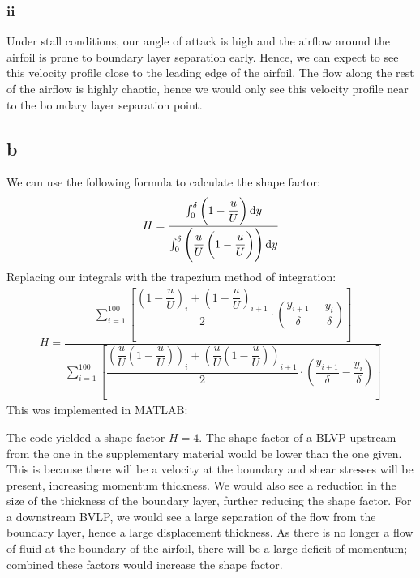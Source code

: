 \documentclass[11pt]{article}
\numberwithin{equation}{section}
\begin{document}
\subsubsection{ii}
Under stall conditions, our angle of attack is high and the airflow around the airfoil is prone to boundary layer separation early. Hence, we can expect to see this velocity profile close to the leading edge of the airfoil. The flow along the rest of the airflow is highly chaotic, hence we would only see this velocity profile near to the boundary layer separation point.
\subsection{b}
We can use the following formula to calculate the shape factor:
\begin{align}
    H = \dfrac{\int_0^{\delta}\left(1 - \dfrac{u}{U}\right)\dif y}{\int_0^{\delta}\left(\dfrac{u}{U}\left(1 - \dfrac{u}{U}\right)\right)\dif y}
\end{align}
Replacing our integrals with the trapezium method of integration:
\begin{align}
    H = \dfrac{\sum_{i=1}^{100}\left[\dfrac{\left(1-\dfrac{u}{U}\right)_i + \left(1-\dfrac{u}{U}\right)_{i+1}}{2}\cdot \left(\dfrac{y_{i+1}}{\delta} - \dfrac{y_i}{\delta}\right)\right]}{\sum_{i=1}^{100}\left[\dfrac{\left(\dfrac{u}{U}\left(1-\dfrac{u}{U}\right)\right)_i + \left(\dfrac{u}{U}\left(1-\dfrac{u}{U}\right)\right)_{i+1}}{2}\cdot \left(\dfrac{y_{i+1}}{\delta} - \dfrac{y_i}{\delta}\right)\right]}
\end{align}
This was implemented in MATLAB:

The code yielded a shape factor $H = 4$. The shape factor of a BLVP upstream from the one in the supplementary material would be lower than the one given. This is because there will be a velocity at the boundary and shear stresses will be present, increasing momentum thickness. We would also see a reduction in the size of the thickness of the boundary layer, further reducing the shape factor. For a downstream BVLP, we would see a large separation of the flow from the boundary layer, hence a large displacement thickness. As there is no longer a flow of fluid at the boundary of the airfoil, there will be a large deficit of momentum; combined these factors would increase the shape factor. 
\end{document}
